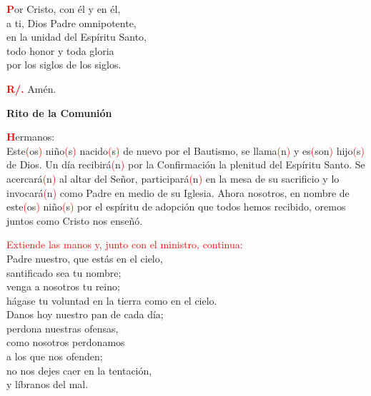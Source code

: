 \documentclass[12pt, letterpaper, spanish]{article}
\begin{document}
  \lettrine[lines=2]{\bfseries \textcolor{red}{P}}{}\Large or Cristo, con \'el y en \'el,\\
  a ti, Dios Padre omnipotente,\\
  en la unidad del Esp\'iritu Santo,\\
  todo honor y toda gloria\\
  por los siglos de los siglos.

  \noindent
  \Large {\bfseries \textcolor{red}{R/.}} \hspace{0.5cm} Am\'en.

  \clearpage

  \begin{center}
    \Huge {\bfseries Rito de la Comuni\'on}
  \end{center}

  \lettrine[lines=2]{\bfseries \textcolor{red}{H}}{}\Large ermanos: \\
  Este\textcolor{red}{(}os\textcolor{red}{)} ni\~no\textcolor{red}{(}s\textcolor{red}{)} nacido\textcolor{red}{(}s\textcolor{red}{)} de nuevo por el Bautismo, se llama\textcolor{red}{(}n\textcolor{red}{)} y es\textcolor{red}{(}son\textcolor{red}{)} hijo\textcolor{red}{(}s\textcolor{red}{)} de Dios. Un d\'ia recibir\'a\textcolor{red}{(}n\textcolor{red}{)} por la Confirmaci\'on la plenitud del Esp\'iritu Santo. Se acercar\'a\textcolor{red}{(}n\textcolor{red}{)} al altar del Se\~nor, participar\'a\textcolor{red}{(}n\textcolor{red}{)} en la mesa de su sacrificio y lo invocar\'a\textcolor{red}{(}n\textcolor{red}{)} como Padre en medio de su Iglesia. Ahora nosotros, en nombre de este\textcolor{red}{(}os\textcolor{red}{)} ni\~no\textcolor{red}{(}s\textcolor{red}{)} por el esp\'iritu de adopci\'on que todos hemos recibido, oremos juntos como Cristo nos ense\~n\'o.

  \large{\textcolor{red}{Extiende las manos y, junto con el ministro, continua:}}\\
  \Large Padre nuestro, que est\'as en el cielo,\\
  santificado sea tu nombre;\\
  venga a nosotros tu reino;\\
  h\'agase tu voluntad en la tierra como en el cielo.\\
  Danos hoy nuestro pan de cada d\'ia;\\
  perdona nuestras ofensas,\\
  como nosotros perdonamos\\
  a los que nos ofenden;\\
  no nos dejes caer en la tentaci\'on,\\
  y l\'ibranos del mal.
\end{document}

